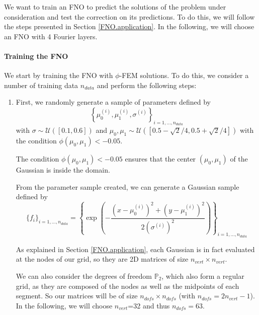 We want to train an FNO to predict the solutions of the problem under consideration and test the correction on its predictions. To do this, we will follow the steps presented in Section \ref{FNO.application}. In the following, we will choose an FNO with 4 Fourier layers.

\paragraph{Training the FNO} \label{Corr.results.FNO.Training}

We start by training the FNO with $\phi$-FEM solutions. To do this, we consider a number of training data $n_{data}$ and perform the following steps:
\begin{enumerate}[label=\textbullet]
	\item First, we randomly generate a sample of parameters defined by
	\begin{equation*}
		\left\{\mu_0^{(i)},\mu_1^{(i)},\sigma^{(i)}\right\}_{i=1,\dots,n_{data}}
	\end{equation*}
	with $\sigma \sim \mathcal{U}([0.1,0.6])$ and $\mu_0, \mu_1 \sim \mathcal{U}([0.5-\sqrt{2}/4, 0.5+\sqrt{2}/4])$ with the condition $\phi(\mu_0, \mu_1) < -0.05$.
	
	\begin{Rem}
		The condition $\phi(\mu_0, \mu_1) < -0.05$ ensures that the center $(\mu_0, \mu_1)$ of the Gaussian is inside the domain.
	\end{Rem}
	
	From the parameter sample created, we can generate a Gaussian sample defined by
	\begin{equation*}
		\{f_i\}_{i=1,\dots,n_{data}}=\left\{\exp\left(-\frac{(x-\mu_0^{(i)})^2 + (y-\mu_1^{(i)})^2}{2(\sigma^{(i)})^2}\right)\right\}_{i=1,\dots,n_{data}}
	\end{equation*}
	
	\begin{Rem}
		As explained in Section \ref{FNO.application}, each Gaussian is in fact evaluated at the nodes of our grid, so they are 2D matrices of size $n_{vert}\times n_{vert}$.
		
		We can also consider the degrees of freedom $\mathbb{P}_2$, which also form a regular grid, as they are composed of the nodes as well as the midpoints of each segment. So our matrices will be of size $n_{dofs}\times n_{dofs}$ (with $n_{dofs}=2n_{vert}-1$). In the following, we will choose $n_{vert}$=32 and thus $n_{dofs}=63$.
	\end{Rem}
	

\end{enumerate}
